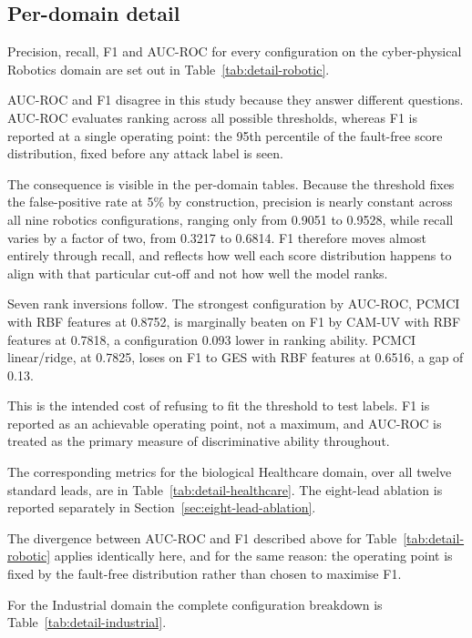 \subsection{Per-domain detail}
\label{sec:per-domain}

Precision, recall, F1 and AUC-ROC for every configuration on the cyber-physical Robotics domain are set out in Table~\ref{tab:detail-robotic}.


AUC-ROC and F1 disagree in this study because they answer different questions. AUC-ROC evaluates ranking across all possible thresholds, whereas F1 is reported at a single operating point: the 95th percentile of the fault-free score distribution, fixed before any attack label is seen.

The consequence is visible in the per-domain tables. Because the threshold fixes the false-positive rate at 5\% by construction, precision is nearly constant across all nine robotics configurations, ranging only from 0.9051 to 0.9528, while recall varies by a factor of two, from 0.3217 to 0.6814. F1 therefore moves almost entirely through recall, and reflects how well each score distribution happens to align with that particular cut-off and not how well the model ranks.

Seven rank inversions follow. The strongest configuration by AUC-ROC, PCMCI with RBF features at 0.8752, is marginally beaten on F1 by CAM-UV with RBF features at 0.7818, a configuration 0.093 lower in ranking ability. PCMCI linear/ridge, at 0.7825, loses on F1 to GES with RBF features at 0.6516, a gap of 0.13.

This is the intended cost of refusing to fit the threshold to test labels. F1 is reported as an achievable operating point, not a maximum, and AUC-ROC is treated as the primary measure of discriminative ability throughout.

The corresponding metrics for the biological Healthcare domain, over all twelve standard leads, are in Table~\ref{tab:detail-healthcare}. The eight-lead ablation is reported separately in Section~\ref{sec:eight-lead-ablation}.


The divergence between AUC-ROC and F1 described above for Table~\ref{tab:detail-robotic} applies identically here, and for the same reason: the operating point is fixed by the fault-free distribution rather than chosen to maximise F1.

For the Industrial domain the complete configuration breakdown is Table~\ref{tab:detail-industrial}.


